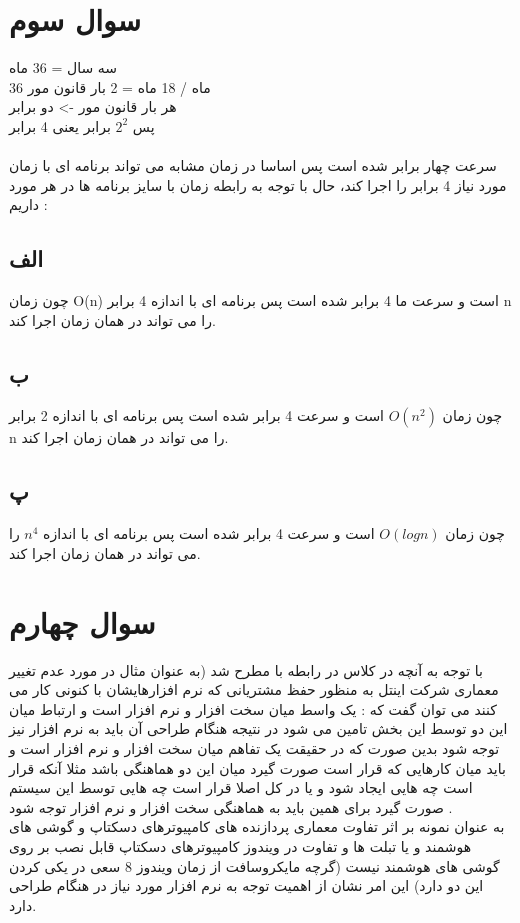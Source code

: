 \documentclass{article}
\begin{document}
\section{سوال سوم}
سه سال = 36 ماه \\
36 ماه / 18 ماه = 2 بار قانون مور\\
هر بار قانون مور -> دو برابر \\
پس $2^2$ برابر یعنی 4 برابر \\
\\
سرعت چهار برابر شده است پس اساسا در زمان مشابه می تواند برنامه ای با زمان مورد نیاز 4 برابر را اجرا کند، حال با توجه به رابطه زمان با سایز برنامه ها در هر مورد داریم :
\subsection{الف}
چون زمان 
O(n)
است و سرعت ما 4 برابر شده است پس برنامه ای با اندازه 4 برابر n را می تواند در همان زمان اجرا کند.

\subsection{ب}
چون زمان 
$O(n^2)$
است و سرعت 4 برابر شده است پس برنامه ای با اندازه 2 برابر n را می تواند در همان زمان اجرا کند.

\subsection{پ}
چون زمان 
$O(log{n})$
است و سرعت 4 برابر شده است پس برنامه ای با اندازه 
$n^4$
را می تواند در همان زمان اجرا کند.
\section{سوال چهارم}
با توجه به آنچه در کلاس در رابطه با  مطرح شد (به عنوان مثال در مورد عدم تغییر معماری شرکت اینتل به منظور حفظ مشتریانی که نرم افزارهایشان با  کنونی کار می کنند می توان گفت که :
{}یک واسط میان سخت افزار و نرم افزار است و ارتباط میان این دو توسط این بخش تامین می شود در نتیجه هنگام طراحی آن باید به نرم افزار نیز توجه شود بدین صورت که در حقیقت {} یک تفاهم میان سخت افزار و نرم افزار است و باید میان کارهایی که قرار است صورت گیرد میان این دو هماهنگی باشد مثلا آنکه قرار است چه {}هایی ایجاد شود و یا در کل اصلا قرار است چه {}هایی توسط این سیستم صورت گیرد برای همین باید به هماهنگی سخت افزار و نرم افزار توجه شود .
\\
به عنوان نمونه بر اثر تفاوت معماری پردازنده های کامپیوترهای دسکتاپ و گوشی های هوشمند و یا تبلت ها و تفاوت در {} ویندوز کامپیوترهای دسکتاپ قابل نصب بر روی گوشی های هوشمند نیست (گرچه مایکروسافت از زمان ویندوز 8 سعی در یکی کردن این دو دارد) این امر نشان از اهمیت توجه به نرم افزار مورد نیاز در هنگام طراحی {} دارد.
\end{document}
